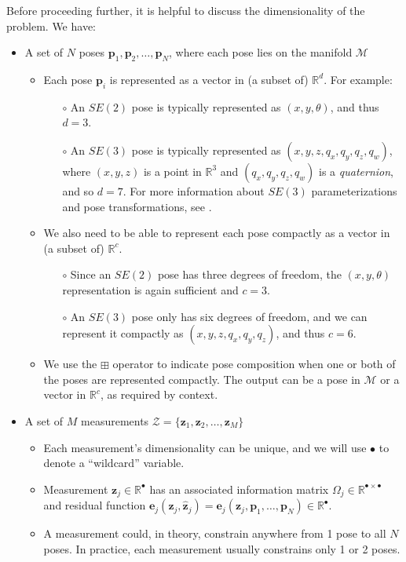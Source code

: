 \documentclass{article}
\def\keyterm{\textit}
\begin{document}
Before proceeding further, it is helpful to discuss the dimensionality of the problem.  We have:
\begin{itemize}
  \item A set of $N$ poses $\mathbf{p}_1, \mathbf{p}_2, \ldots, \mathbf{p}_N$, where each pose lies on the manifold $\mathcal{M}$
  \begin{itemize}
    \item Each pose $\mathbf{p}_i$ is represented as a vector in (a subset of) $\mathbb{R}^d$.  For example:
    \begin{itemize}
      \item[$\circ$] An $SE(2)$ pose is typically represented as $(x, y, \theta)$, and thus $d = 3$.
      \item[$\circ$] An $SE(3)$ pose is typically represented as $(x, y, z, q_x, q_y, q_z, q_w)$, where $(x, y, z)$ is a point in $\mathbb{R}^3$ and $(q_x, q_y, q_z, q_w)$ is a \keyterm{quaternion}, and so $d = 7$.  For more information about $SE(3)$ parameterizations and pose transformations, see \cite{blanco2010tutorial}.
    \end{itemize}
    \item We also need to be able to represent each pose compactly as a vector in (a subset of) $\mathbb{R}^c$.
    \begin{itemize}
      \item[$\circ$] Since an $SE(2)$ pose has three degrees of freedom, the $(x, y, \theta)$ representation is again sufficient and $c=3$.  
      \item[$\circ$] An $SE(3)$ pose only has six degrees of freedom, and we can represent it compactly as $(x, y, z, q_x, q_y, q_z)$, and thus $c=6$.
    \end{itemize}
    \item We use the $\boxplus$ operator to indicate pose composition when one or both of the poses are represented compactly.  The output can be a pose in $\mathcal{M}$ or a vector in $\mathbb{R}^c$, as required by context.
  \end{itemize}
  \item A set of $M$ measurements $\mathcal{Z} = \{\mathbf{z}_1, \mathbf{z}_2, \ldots, \mathbf{z}_M\}$
  \begin{itemize}
    \item Each measurement's dimensionality can be unique, and we will use $\bullet$ to denote a ``wildcard'' variable.
    \item Measurement $\mathbf{z}_j \in \mathbb{R}^\bullet$ has an associated information matrix $\Omega_j \in \mathbb{R}^{\bullet \times \bullet}$ and residual function $\mathbf{e}_j(\mathbf{z}_j, \hat{\mathbf{z}}_j) = \mathbf{e}_j(\mathbf{z}_j, \mathbf{p}_1, \ldots, \mathbf{p}_N) \in \mathbb{R}^\bullet$.
    \item A measurement could, in theory, constrain anywhere from 1 pose to all $N$ poses.  In practice, each measurement usually constrains only 1 or 2 poses.  
  \end{itemize}
\end{itemize}
\end{document}
